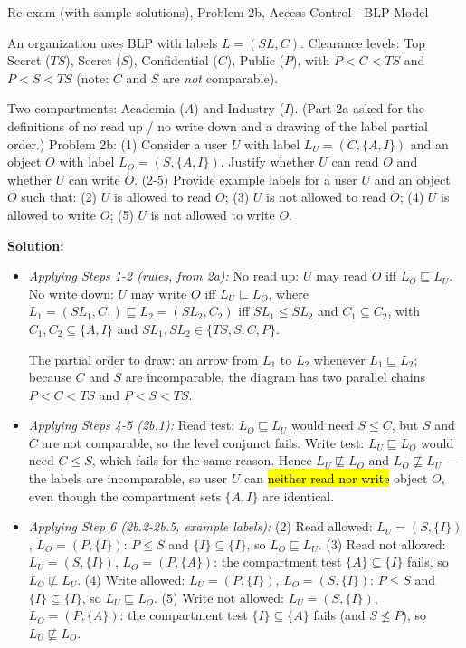 \documentclass[12pt, a4paper]{article}
\newcommand{\imp}[1]{\hl{#1}}                       %
\begin{document}
\begin{practicebox}{Re-exam (with sample solutions), Problem 2b, Access Control - BLP Model}
\begin{problembox}
An organization uses BLP with labels $L = (SL, C)$. Clearance levels: Top Secret ($TS$), Secret ($S$), Confidential ($C$), Public ($P$), with $P < C < TS$ and $P < S < TS$ (note: $C$ and $S$ are \emph{not} comparable).

Two compartments: Academia ($A$) and Industry ($I$). (Part 2a asked for the definitions of no read up / no write down and a drawing of the label partial order.) Problem 2b: (1) Consider a user $U$ with label $L_U = (C, \{A, I\})$ and an object $O$ with label $L_O = (S, \{A, I\})$.
Justify whether $U$ can read $O$ and whether $U$ can write $O$. (2-5) Provide example labels for a user $U$ and an object $O$ such that: (2) $U$ is allowed to read $O$; (3) $U$ is not allowed to read $O$; (4) $U$ is allowed to write $O$; (5) $U$ is not allowed to write $O$.
\end{problembox}

\textbf{Solution:}
\begin{itemize}
    \item \textit{Applying Steps 1-2 (rules, from 2a):} No read up: $U$ may read $O$ iff $L_O \sqsubseteq L_U$. No write down: $U$ may write $O$ iff $L_U \sqsubseteq L_O$, where $L_1 = (SL_1, C_1) \sqsubseteq L_2 = (SL_2, C_2)$ iff $SL_1 \leq SL_2$ and $C_1 \subseteq C_2$, with $C_1, C_2 \subseteq \{A, I\}$ and $SL_1, SL_2 \in \{TS, S, C, P\}$.

    The partial order to draw: an arrow from $L_1$ to $L_2$ whenever $L_1 \sqsubseteq L_2$; because $C$ and $S$ are incomparable, the diagram has two parallel chains $P < C < TS$ and $P < S < TS$.
    \item \textit{Applying Steps 4-5 (2b.1):} Read test: $L_O \sqsubseteq L_U$ would need $S \leq C$, but $S$ and $C$ are not comparable, so the level conjunct fails. Write test: $L_U \sqsubseteq L_O$ would need $C \leq S$, which fails for the same reason.
    Hence $L_U \not\sqsubseteq L_O$ and $L_O \not\sqsubseteq L_U$ --- the labels are incomparable, so user $U$ can \imp{neither read nor write} object $O$, even though the compartment sets $\{A, I\}$ are identical.
    \item \textit{Applying Step 6 (2b.2-2b.5, example labels):} (2) Read allowed: $L_U = (S, \{I\})$, $L_O = (P, \{I\})$: $P \leq S$ and $\{I\} \subseteq \{I\}$, so $L_O \sqsubseteq L_U$. (3) Read not allowed: $L_U = (S, \{I\})$, $L_O = (P, \{A\})$: the compartment test $\{A\} \subseteq \{I\}$ fails, so $L_O \not\sqsubseteq L_U$. (4) Write allowed: $L_U = (P, \{I\})$, $L_O = (S, \{I\})$: $P \leq S$ and $\{I\} \subseteq \{I\}$, so $L_U \sqsubseteq L_O$. (5) Write not allowed: $L_U = (S, \{I\})$, $L_O = (P, \{A\})$: the compartment test $\{I\} \subseteq \{A\}$ fails (and $S \not\leq P$), so $L_U \not\sqsubseteq L_O$.
\end{itemize}


\end{practicebox}
\end{document}

